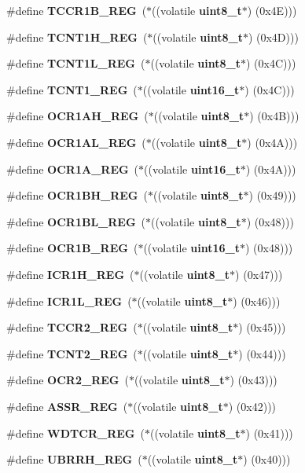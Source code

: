 \begin{DoxyCompactItemize}
\item 
\#define \textbf{ T\+C\+C\+R1\+B\+\_\+\+R\+EG}~($\ast$((volatile \textbf{ uint8\+\_\+t}$\ast$) (0x4\+E)))
\item 
\#define \textbf{ T\+C\+N\+T1\+H\+\_\+\+R\+EG}~($\ast$((volatile \textbf{ uint8\+\_\+t}$\ast$) (0x4\+D)))
\item 
\#define \textbf{ T\+C\+N\+T1\+L\+\_\+\+R\+EG}~($\ast$((volatile \textbf{ uint8\+\_\+t}$\ast$) (0x4\+C)))
\item 
\#define \textbf{ T\+C\+N\+T1\+\_\+\+R\+EG}~($\ast$((volatile \textbf{ uint16\+\_\+t}$\ast$) (0x4\+C)))
\item 
\#define \textbf{ O\+C\+R1\+A\+H\+\_\+\+R\+EG}~($\ast$((volatile \textbf{ uint8\+\_\+t}$\ast$) (0x4\+B)))
\item 
\#define \textbf{ O\+C\+R1\+A\+L\+\_\+\+R\+EG}~($\ast$((volatile \textbf{ uint8\+\_\+t}$\ast$) (0x4\+A)))
\item 
\#define \textbf{ O\+C\+R1\+A\+\_\+\+R\+EG}~($\ast$((volatile \textbf{ uint16\+\_\+t}$\ast$) (0x4\+A)))
\item 
\#define \textbf{ O\+C\+R1\+B\+H\+\_\+\+R\+EG}~($\ast$((volatile \textbf{ uint8\+\_\+t}$\ast$) (0x49)))
\item 
\#define \textbf{ O\+C\+R1\+B\+L\+\_\+\+R\+EG}~($\ast$((volatile \textbf{ uint8\+\_\+t}$\ast$) (0x48)))
\item 
\#define \textbf{ O\+C\+R1\+B\+\_\+\+R\+EG}~($\ast$((volatile \textbf{ uint16\+\_\+t}$\ast$) (0x48)))
\item 
\#define \textbf{ I\+C\+R1\+H\+\_\+\+R\+EG}~($\ast$((volatile \textbf{ uint8\+\_\+t}$\ast$) (0x47)))
\item 
\#define \textbf{ I\+C\+R1\+L\+\_\+\+R\+EG}~($\ast$((volatile \textbf{ uint8\+\_\+t}$\ast$) (0x46)))
\item 
\#define \textbf{ T\+C\+C\+R2\+\_\+\+R\+EG}~($\ast$((volatile \textbf{ uint8\+\_\+t}$\ast$) (0x45)))
\item 
\#define \textbf{ T\+C\+N\+T2\+\_\+\+R\+EG}~($\ast$((volatile \textbf{ uint8\+\_\+t}$\ast$) (0x44)))
\item 
\#define \textbf{ O\+C\+R2\+\_\+\+R\+EG}~($\ast$((volatile \textbf{ uint8\+\_\+t}$\ast$) (0x43)))
\item 
\#define \textbf{ A\+S\+S\+R\+\_\+\+R\+EG}~($\ast$((volatile \textbf{ uint8\+\_\+t}$\ast$) (0x42)))
\item 
\#define \textbf{ W\+D\+T\+C\+R\+\_\+\+R\+EG}~($\ast$((volatile \textbf{ uint8\+\_\+t}$\ast$) (0x41)))
\item 
\#define \textbf{ U\+B\+R\+R\+H\+\_\+\+R\+EG}~($\ast$((volatile \textbf{ uint8\+\_\+t}$\ast$) (0x40)))

\end{DoxyCompactItemize}
